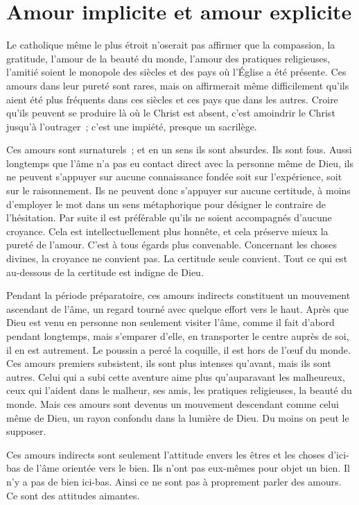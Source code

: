 \documentclass[french,twoside]{book} %
\begin{document}
\section[Amour implicite et amour explicite]{Amour implicite et amour explicite}
\noindent Le catholique même le plus étroit n'oserait pas affirmer que la compassion, la gratitude, l'amour de la beauté du monde, l'amour des pratiques religieuses, l'amitié soient le monopole des siècles et des pays où l'Église a été présente. Ces amours dans leur pureté sont rares, mais on affirmerait même difficilement qu'ils aient été plus fréquents dans ces siècles et ces pays que dans les autres. Croire qu'ils peuvent se produire là où le Christ est absent, c'est amoindrir le Christ jusqu'à l'outrager ; c'est une impiété, presque un sacrilège.\par
Ces amours sont surnaturels ; et en un sens ils sont absurdes. Ils sont fous. Aussi longtemps que l'âme n'a pas eu contact direct avec la personne même de Dieu, ils ne peuvent s'appuyer sur aucune connaissance fondée soit sur l'expérience, soit sur le raisonnement. Ils ne peuvent donc s'appuyer sur aucune certitude, à moins d'employer le mot dans un sens métaphorique pour désigner le contraire de l'hésitation. Par suite il est préférable qu'ils ne soient accompagnés d'aucune croyance. Cela est intellectuellement plus honnête, et cela préserve mieux la pureté de l'amour. C'est à tous égards plus convenable. Concernant les choses divines, la croyance ne convient pas. La certitude seule convient. Tout ce qui est au-dessous de la certitude est indigne de Dieu.\par
Pendant la période préparatoire, ces amours indirects constituent un mouvement ascendant de l'âme, un regard tourné avec quelque effort vers le haut. Après que Dieu est venu en personne non seulement visiter l'âme, comme il fait d'abord pendant longtemps, mais s'emparer d'elle, en transporter le centre auprès de soi, il en est autrement. Le poussin a percé la coquille, il est hors de l'œuf du monde. Ces amours premiers subsistent, ils sont plus intenses qu'avant, mais ils sont autres. Celui qui a subi cette aventure aime plus qu'auparavant les malheureux, ceux qui l'aident dans le malheur, ses amis, les pratiques religieuses, la beauté du monde. Mais ces amours sont devenus un mouvement descendant comme celui même de Dieu, un rayon confondu dans la lumière de Dieu. Du moins on peut le supposer.\par
Ces amours indirects sont seulement l'attitude envers les êtres et les choses d'ici-bas de l'âme orientée vers le bien. Ils n'ont pas eux-mêmes pour objet un bien. Il n'y a pas de bien ici-bas. Ainsi ce ne sont pas à proprement parler des amours. Ce sont des attitudes aimantes.\par
\end{document}

